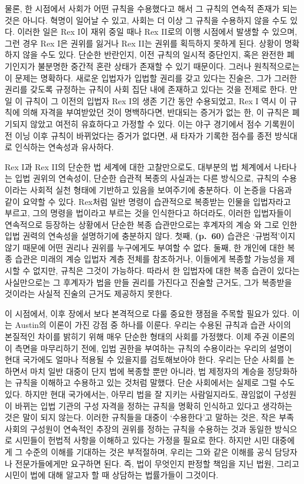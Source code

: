 물론, 한 시점에서 사회가 어떤 규칙을 수용했다고 해서 그 규칙의 연속적
존재가 되는 것은 아니다. 혁명이 일어날 수 있고,
사회는 더 이상 그 규칙을 수용하지 않을 수도 있다. 이러한 일은 Rex I이
재위 중일 때나 Rex II로의 이행 시점에서 발생할 수 있으며, 그런 경우 Rex
I은 권위를 잃거나 Rex II는 권위를 획득하지 못하게 된다. 상황이 명확하지
않을 수도 있다. 단순한 반란인지, 이전 규칙의 일시적 중단인지, 혹은
완전한 폐기인지가 불분명한 중간적 혼란 상태가 존재할 수 있기 때문이다.
그러나 원칙적으로는 이 문제는 명확하다. 새로운 입법자가 입법할 권리를
갖고 있다는 진술은, 그가 그러한 권리를 갖도록 규정하는 규칙이 사회 집단
내에 존재하고 있다는 것을 전제로 한다. 만일 이 규칙이 그 이전의 입법자
Rex I의 생존 기간 동안 수용되었고, Rex I 역시 이 규칙에 의해 자격을
부여받았던 것이 명백하다면, 반대되는 증거가 없는 한, 이 규칙은 폐기되지
않았고 여전히 유효하다고 가정할 수 있다. 이는 야구 경기에서 점수
기록원이 전 이닝 이후 규칙이 바뀌었다는 증거가 없다면, 새 타자가 기록한
점수를 종전 방식대로 인식하는 연속성과 유사하다.

Rex I과 Rex II의 단순한 법 세계에 대한 고찰만으로도, 대부분의 법
체계에서 나타나는 입법 권위의 연속성이, 단순한 습관적 복종의 사실과는
다른 방식으로, 규칙의 수용이라는 사회적 실천 형태에 기반하고 있음을
보여주기에 충분하다. 이 논증을 다음과 같이 요약할 수 있다. Rex처럼 일반
명령이 습관적으로 복종받는 인물을 입법자라고 부르고, 그의 명령을
법이라고 부르는 것을 인식한다고 하더라도, 이러한 입법자들이 연속적으로
등장하는 상황에서 단순한 복종 습관만으로는 후계자의 계승
와 그로 인한 입법 권력의 연속성을 설명하기에 충분하지
않다. 첫째, \textbf{(p.~60)} 습관은 `규범적'이지 않기 때문에 어떤 권리나
권위를 누구에게도 부여할 수 없다. 둘째, 한 개인에 대한 복종 습관은
미래의 계승 입법자 계층 전체를 참조하거나, 이들에게 복종할 가능성을
제시할 수 없지만, 규칙은 그것이 가능하다. 따라서 한 입법자에 대한 복종
습관이 있다는 사실만으로는 그 후계자가 법을 만들 권리를 가진다고 진술할
근거도, 그가 복종받을 것이라는 사실적 진술의 근거도 제공하지 못한다.

이 시점에서, 이후 장에서 보다 본격적으로 다룰 중요한 쟁점을 주목할
필요가 있다. 이는 Austin의 이론이 가진 강점 중 하나를 이룬다. 우리는
수용된 규칙과 습관 사이의 본질적인 차이를 밝히기 위해 매우 단순한 형태의
사회를 가정했다. 이제 주권 이론의 이 측면을 마무리하기 전에, 입법 권한을
부여하는 규칙의 수용이라는 우리의 설명이 현대 국가에도 얼마나 적용될 수
있을지를 검토해보아야 한다. 우리는 단순 사회를 논하면서 마치 일반 대중이
단지 법에 복종할 뿐만 아니라, 법 제정자의 계승을 정당화하는 규칙을
이해하고 수용하고 있는 것처럼 말했다. 단순 사회에서는 실제로 그럴 수도
있다. 하지만 현대 국가에서는, 아무리 법을 잘 지키는 사람일지라도,
끊임없이 구성원이 바뀌는 입법 기관의 구성 자격을 정하는 규칙을 명확히
인식하고 있다고 생각하는 것은 말이 되지 않는다. 이러한 규칙들을 대중이
`수용한다'고 말하는 것은, 작은 부족 사회의 구성원이 연속적인 추장의
권위를 정하는 규칙을 수용하는 것과 동일한 방식으로 시민들이 헌법적
사항을 이해하고 있다는 가정을 필요로 한다. 하지만 시민 대중에게 그
수준의 이해를 기대하는 것은 부적절하며, 우리는 그와 같은 이해를 공식
담당자나 전문가들에게만 요구하면 된다. 즉, 법이 무엇인지 판정할 책임을
지닌 법원, 그리고 시민이 법에 대해 알고자 할 때 상담하는 법률가들이
그것이다.

